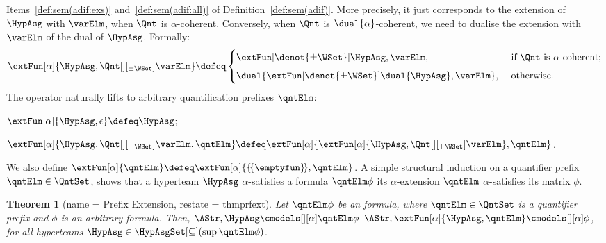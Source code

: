 \documentclass[authoryear]{elsarticle}
\newtheorem{theorem}{Theorem}
\newcommand{\TrvHypAsg}{\{\!\{\emptyfun\}\!\}}
\begin{document}
Items~\ref{def:sem(adif:exs)} and~\ref{def:sem(adif:all)} of
Definition~\ref{def:sem(adif)}.
More precisely, it just corresponds to the extension of $\HypAsg$ with
$\varElm$, when $\Qnt$ is $\alpha$-coherent.
Conversely, when $\Qnt$ is $\dual{\alpha}$-coherent, we need to dualise the
extension with $\varElm$ of the dual of $\HypAsg$.
Formally:
%
\[
  \extFun[\alpha]{\HypAsg, \Qnt[][_{\pm\WSet}] \varElm} \defeq
  \begin{cases}
    {\extFun[\denot{\pm\WSet}]{\HypAsg, \varElm}},
      & \text{ if } {\Qnt} \text{ is }  \alpha\text{-coherent}; \\\\[-0.95em]
    {\dual{\extFun[\denot{\pm\WSet}]{\dual{\HypAsg}, \varElm}}},
      & \text{ otherwise}.
  \end{cases}
\]
%
The operator naturally lifts to arbitrary quantification prefixes $\qntElm$:
\begin{inparaenum}[1)]
  \item
    $\extFun[\alpha]{\HypAsg, \epsilon} \defeq \HypAsg$;
  \item
    $\extFun[\alpha]{\HypAsg, \Qnt[][_{\pm\WSet}] \varElm \ldotp \qntElm} \defeq
    \extFun[\alpha]{\extFun[\alpha]{\HypAsg, \Qnt[][_{\pm\WSet}] \varElm},
    \qntElm}$.
\end{inparaenum}
We also define $\extFun[\alpha]{\qntElm} \defeq \extFun[\alpha]{\TrvHypAsg,
\qntElm}$.
A simple structural induction on a quantifier prefix $\qntElm \in \QntSet$,
shows that a hyperteam $\HypAsg$ $\alpha$-satisfies a formula $\qntElm \phi$
\iff its $\alpha$-extension \wrt $\qntElm$ $\alpha$-satisfies its matrix $\phi$.

\begin{theorem}[name = Prefix Extension, restate = thmprfext]
  \label{thm:prfext}
  Let $\qntElm \phi$ be an \ADIF formula, where $\qntElm \in \QntSet$ is a
  quantifier prefix and $\phi$ is an arbitrary \ADIF formula.
  Then, $\AStr, \HypAsg \cmodels[][\alpha] \qntElm \phi$ \iff $\AStr,
  \extFun[\alpha]{\HypAsg, \qntElm} \cmodels[][\alpha] \phi$, for all
  hyperteams $\HypAsg \in \HypAsgSet[\subseteq](\sup{\qntElm \phi})$.
\end{theorem}






\end{document}
